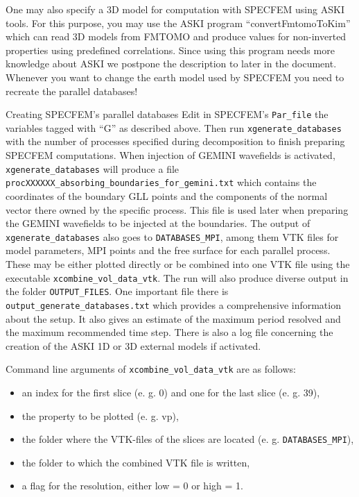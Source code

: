  One may also specify a 3D model for computation with SPECFEM using ASKI tools. For this purpose, you may use the ASKI program ``convertFmtomoToKim'' which can read 3D models from FMTOMO and produce values for non-inverted properties using predefined correlations. Since using this program needs more knowledge about ASKI we postpone the description to later in the document. Whenever you want to change the earth model used by SPECFEM you need to recreate the parallel databases!
%
\begin{actionbox}[label={action:generate-databases},float=h!]{Creating SPECFEM's parallel databases}
   Edit in SPECFEM's \verb+Par_file+ the variables tagged with ``G'' as described above. Then run \verb+xgenerate_databases+ with the number of processes specified during decomposition to finish preparing SPECFEM computations. When injection of GEMINI wavefields is activated, \verb+xgenerate_databases+ will produce a file \verb+procXXXXXX_absorbing_boundaries_for_gemini.txt+ which contains the coordinates of the boundary GLL points and the components of the normal vector there owned by the specific process. This file is used later when preparing the GEMINI wavefields to be injected at the boundaries. The output of \verb+xgenerate_databases+ also goes to \verb+DATABASES_MPI+, among them VTK files for model parameters, MPI points and the free surface for each parallel process. These may be either plotted directly or be combined into one VTK file using the executable \verb+xcombine_vol_data_vtk+. The run will also produce diverse output in the folder \verb+OUTPUT_FILES+. One important file there is \verb+output_generate_databases.txt+ which provides a comprehensive information about the setup. It also gives an estimate of the maximum period resolved and the maximum recommended time step. There is also a log file concerning the creation of the ASKI 1D or 3D external models if activated.
\end{actionbox}

Command line arguments of \verb+xcombine_vol_data_vtk+ are as follows:
 \begin{itemize}
	\setlength{\itemsep}{-0.1cm}
   \item an index for the first slice (e. g. 0) and one for the last slice (e. g. 39),
   \item the property to be plotted (e. g. vp),
   \item the folder where the VTK-files of the slices are located (e. g. \verb+DATABASES_MPI+),
   \item the folder to which the combined VTK file is written,
   \item a flag for the resolution, either low = 0 or high = 1.
 \end{itemize}
